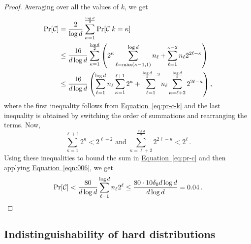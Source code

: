 \documentclass[11pt]{article}
\numberwithin{equation}{section}
\theoremstyle{definition}
\theoremstyle{plain}
\newcommand{\expeqref}[2]{\hyperref[#2]{#1~\eqref{#2}}}
\newcommand{\cC}{\ensuremath{\mathcal{C}}}
\newcommand{\lbconst}{\ensuremath{\delta_0}}
\begin{document}
\begin{proof}
Averaging over all
the  %
values of $k$, we get
\begin{align}
\Pr[\cC] & = \frac{2}{\log d} \sum_{\kappa=1}^{\frac{\log d}{2}}\Pr[\cC | k = \kappa] \notag \\
& \leq \frac{16}{d \log d} \sum_{\kappa=1}^{\frac{\log d}{2}} \left(  2^{\kappa} \sum\limits_{\ell = \max(\kappa - 1,1)}^{\log d} n_\ell + \sum_{\ell=1}^{\kappa-2} n_\ell 2^{2\ell - \kappa} \right) \notag \\
%
%
%
& \leq \frac{16}{d\log d} \left(\sum_{\ell=1}^{\log d} n_\ell \sum\limits_{\kappa = 1}^{\ell+1} 2^{\kappa} + \sum_{\ell=1}^{\frac{\log d}{2} - 2} n_\ell \sum\limits_{\kappa = \ell + 2}^{\frac{\log d}{2}} 2^{2\ell - \kappa}  \right), \label{eq:pr-c}
\end{align}
where the first inequality follows from \expeqref{Equation}{eq:pr-c-k} and the last inequality is obtained by switching the order of summations and rearranging the terms.
Now,
\[
\sum_{\kappa = 1}^{\ell+1} 2^{\kappa} < 2^{\ell + 2}
\text{ and }
\sum_{\kappa= \ell+2}^{\frac{\log d}{2}} 2^{2\ell - \kappa} < 2^\ell\,.
\]
Using these inequalities to bound the sum in \expeqref{Equation}{eq:pr-c} and then applying \expeqref{Equation}{eqn:006}, we get
\[
\Pr[\cC] < \frac{80}{d\log d} \sum_{\ell=1}^{\log d} n_\ell 2^\ell
\leq \frac{80 \cdot 10 \lbconst d \log d}{d\log d}=0.04\,.\qedhere  %
\]
\end{proof}

\subsection{Indistinguishability of hard distributions}\label{sec:indisting}
\end{document}
